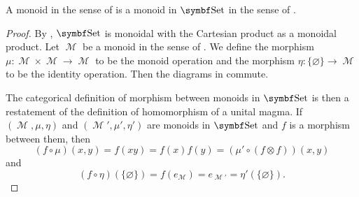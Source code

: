 \begin{proposition}\label{thm:monoids_are_monoids_in_set}
  A monoid in the sense of  is a monoid in \( \Cat{Set} \) in the sense of .
\end{proposition}
\begin{proof}
  By , \( \Cat{Set} \) is monoidal with the Cartesian product as a monoidal product. Let \( \mscrM \) be a monoid in the sense of . We define the morphism \( \mu: \mscrM \times \mscrM \to \mscrM \) to be the monoid operation and the morphism \( \eta: \{ \varnothing \} \to \mscrM \) to be the identity operation. Then the diagrams in  commute.

  The categorical definition of morphism between monoids in \( \Cat{Set} \) is then a restatement of the definition of homomorphism of a unital magma. If \( (\mscrM, \mu, \eta) \) and \( (\mscrM', \mu', \eta') \) are monoids in \( \Cat{Set} \) and \( f \) is a morphism between them, then
  \begin{equation*}
    (f \circ \mu)(x, y)
    =
    f(xy)
    =
    f(x) f(y)
    =
    (\mu' \circ (f \otimes f))(x, y)
  \end{equation*}
  and
  \begin{equation*}
    (f \circ \eta)(\{ \varnothing \})
    =
    f(e_{\mscrM})
    =
    e_{\mscrM'}
    =
    \eta'(\{ \varnothing \}).
  \end{equation*}
\end{proof}
